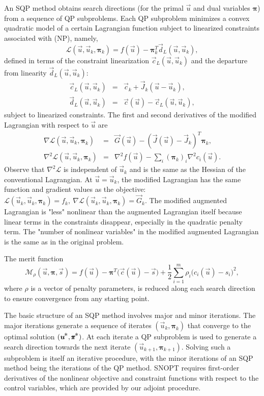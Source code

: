 \documentclass[twocolumn,numbook]{svjour3}          %
\def\u{{\vec u}}
\def\c{{\vec c}}
\def\d{{\vec d}}
\def\s{{\vec s}}
\def\g{{\vec{G}}}
\def\bpi{{\pmb{\pi}}}%
\def\J{{\vec J}}
\def\disp{\displaystyle}
\def\grad{\nabla}
\def\half  {{\textstyle{\frac12}}}
\def\Hess{\nabla^2}
\def\kp#1{_{k+#1}}
\def\Mscr{{\mathcal M}}
\def\nthinsp{\mskip -2   mu}
\def\Lscr{{\mathcal L}}
\def\bpistar{\bpi\superstar}
\def\superstar{^{\raise 0.5pt\hbox{$\nthinsp *$}}}
\def\T{^T\!}
\def\ustar{\u\superstar}
\def\fk{f_k}
\def\gk{\g_k}
\def\ck{\c_k}
\def\Jk{\J_k}
\def\cL{\c_{\scriptscriptstyle L}} %
\def\dL{\d_{\scriptscriptstyle L}} %
\def\SNOPT {{\small SNOPT}}
\begin{document}
 An SQP method obtains search directions (for the primal $\u$ and dual variables $\bpi$) from a sequence of QP subproblems.  
 Each QP subproblem minimizes a convex quadratic
model of a certain Lagrangian function subject to
linearized constraints associated with (NP), namely,
\begin{equation}                                 \label{eqn-def-ML}
        \Lscr(\u,\u_k,\bpi_k) = f(\u) - \bpi_k^T \dL(\u,\u_k),
\end{equation}
defined in terms of the constraint linearization $\cL(\u,\u_k)$
and the departure from linearity $\dL(\u,\u_k)$:
\begin{eqnarray*}
        \cL(\u,\u_k) &=& \ck  + \Jk(\u - \u_k),
     \\ \dL(\u,\u_k) &=& \c(\u) - \cL(\u,\u_k),
\end{eqnarray*}
subject to linearized constraints.  
The first and second derivatives of the modified Lagrangian with
respect to $\u$ are
\begin{eqnarray*}
        \grad\Lscr(\u,\u_k,\bpi_k) &=& \g(\u) - (\J(\u) - \Jk)\T \bpi_k, \\[3pt]
        \Hess\Lscr(\u,\u_k,\bpi_k) &=& \disp \Hess f(\u)
                                           - \sum_i (\bpi_k)_i \Hess c_i(\u).
\end{eqnarray*}
Observe that $\Hess\Lscr$ is independent of $\u_k$
and is the same as the Hessian of the conventional Lagrangian.
At $\u = \u_k$, the modified Lagrangian has the same function and
gradient values as the objective:
$
           \Lscr(\u_k,\u_k,\bpi_k) = \fk, \ %
     \grad \Lscr(\u_k,\u_k,\bpi_k) = \gk.
$
The modified augmented Lagrangian is "less" nonlinear than the augmented Lagrangian itself
because linear terms in the constraints disappear, especially in the quadratic penalty term.
The "number of nonlinear variables" in the modified augmented Lagrangian is the same as in the original
problem.

The merit function 
\begin{equation}                              \label{eqn-def-merit}
        \Mscr_\rho(\u,\bpi,\s)
          = f(\u) - \bpi\T \bigl( \c(\u) - \s \bigr)
            + \half \sum_{i=1}^m \rho_i\big( c_i(\u) - s_i\big)^2,
\end{equation}
where $\rho$ is a vector of penalty parameters,
is reduced along each search
direction to ensure convergence from any starting point.

 The basic structure of an SQP method involves major and
minor iterations.  The major iterations generate a sequence of
iterates $(\u_k,\bpi_k)$ that converge to the optimal solution $(\ustar,\bpistar)$.
At each iterate a QP subproblem is used to generate a search direction
towards the next iterate $(\u\kp1,\bpi\kp1)$.  Solving such a subproblem
is itself an iterative procedure, with the minor iterations of an
SQP method being the iterations of the QP method.
\SNOPT{} requires first-order derivatives of the nonlinear
objective and constraint functions with respect to the control variables, which
are provided by our adjoint procedure.
\end{document}
